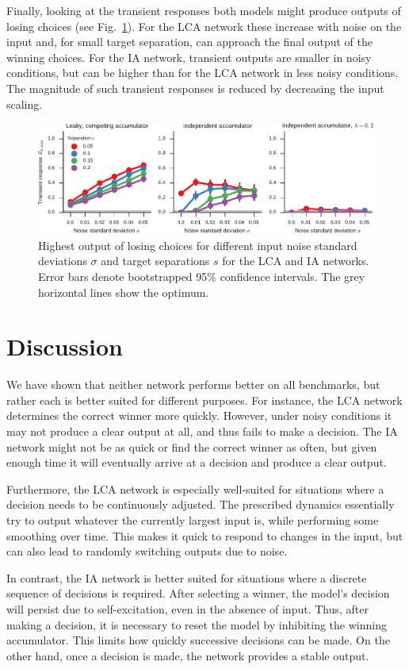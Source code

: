 \documentclass[10pt,letterpaper]{article}
\begin{document}
Finally, looking at the transient responses both models might produce outputs of losing choices (see Fig.~\ref{fig:transient}).
For the LCA network these increase with noise on the input and, for small target separation, can approach the final output of the winning choices.
For the IA network, transient outputs are smaller in noisy conditions, but can be higher than for the LCA network in less noisy conditions.
The magnitude of such transient responses is reduced by decreasing the input scaling.
\begin{figure}
    \centering
    \includegraphics{figures/transient}
    \caption{
        Highest output of losing choices for different input noise standard deviations $\sigma$ and target separations $s$ for the LCA and IA networks.
        Error bars denote bootstrapped 95\% confidence intervals.
        The grey horizontal lines show the optimum.
    }\label{fig:transient}
\end{figure}

\section{Discussion}
We have shown that neither network performs better on all benchmarks, but rather each is better suited for different purposes.
For instance, the LCA network determines the correct winner more quickly.
However, under noisy conditions it may not produce a clear output at all, and thus fails to make a decision.
The IA network might not be as quick or find the correct winner as often, but given enough time it will eventually arrive at a decision and produce a clear output.

Furthermore, the LCA network is especially well-suited for situations where a decision needs to be continuously adjusted.
The prescribed dynamics essentially try to output whatever the currently largest input is, while performing some smoothing over time.
This makes it quick to respond to changes in the input, but can also lead to randomly switching outputs due to noise.

In contrast, the IA network is better suited for situations where a discrete sequence of decisions is required.
After selecting a winner, the model's decision will persist due to self-excitation, even in the absence of input.
Thus, after making a decision, it is necessary to reset the model by inhibiting the winning accumulator.
This limits how quickly successive decisions can be made.
On the other hand, once a decision is made, the network provides a stable output.
\end{document}
